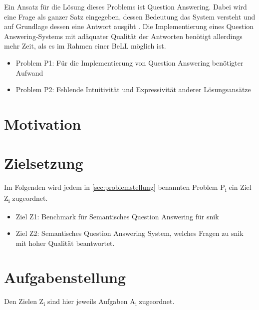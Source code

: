 Ein Ansatz für die Lösung dieses Problems ist Question Answering.
Dabei wird eine Frage als ganzer Satz eingegeben, dessen Bedeutung das System versteht und auf Grundlage dessen eine Antwort ausgibt \citep{qadefinition}.
Die Implementierung eines Question Answering-Systems mit adäquater Qualität der Antworten benötigt allerdings mehr Zeit, als es im Rahmen einer BeLL möglich ist.

\begin{itemize}
	\item Problem P1: Für die Implementierung von Question Answering benötigter Aufwand
	\item Problem P2: Fehlende Intuitivität und Expressivität anderer Lösungsansätze
\end{itemize}


\section{Motivation}


\section{Zielsetzung}\label{sec:zielsetzung}

Im Folgenden wird jedem in \cref{sec:problemstellung} benannten Problem P\textsubscript{i} ein Ziel Z\textsubscript{i} zugeordnet.

	\begin{itemize}
		\item Ziel Z1: Benchmark für Semantisches Question Answering für \ac{snik}
		\item Ziel Z2: Semantisches Question Answering System, welches Fragen zu \ac{snik} mit hoher Qualität beantwortet.
	\end{itemize}
\section{Aufgabenstellung}

Den Zielen Z\textsubscript{i} sind hier jeweils Aufgaben A\textsubscript{i} zugeordnet.

